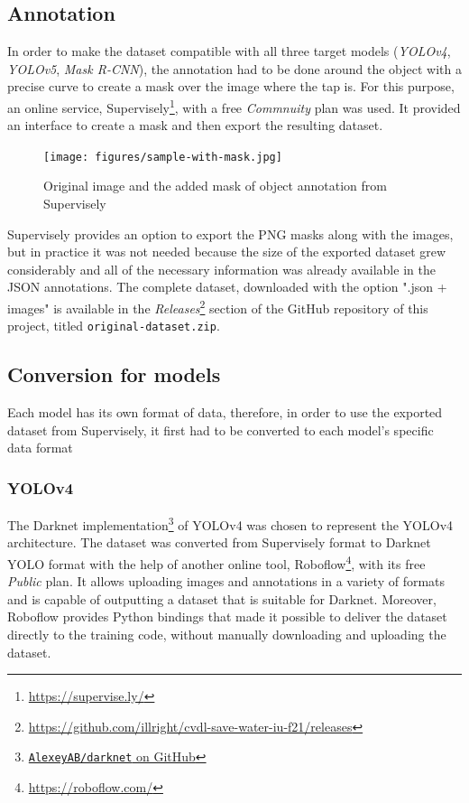 \documentclass[journal,onecolumn]{IEEEtran}
\begin{document}
\subsection{Annotation}

In order to make the dataset compatible with all three target models (\emph{YOLOv4}, \emph{YOLOv5}, \emph{Mask R-CNN}), the annotation had to be done around the object with a precise curve to create a mask over the image where the tap is. For this purpose, an online service, Supervisely\footnote{\href{https://supervise.ly/}{https://supervise.ly/}}, with a free \emph{Commnuity} plan was used. It provided an interface to create a mask and then export the resulting dataset.

\begin{figure}
    \centering
    \texttt{[image: figures/sample-with-mask.jpg]}
    \caption{Original image and the added mask of object annotation from Supervisely}
\end{figure}

Supervisely provides an option to export the PNG masks along with the images, but in practice it was not needed because the size of the exported dataset grew considerably and all of the necessary information was already available in the JSON annotations. The complete dataset, downloaded with the option ".json + images" is available in the \emph{Releases}\footnote{\href{https://github.com/illright/cvdl-save-water-iu-f21/releases}{https://github.com/illright/cvdl-save-water-iu-f21/releases}} section of the GitHub repository of this project, titled \texttt{original-dataset.zip}.

\subsection{Conversion for models}

Each model has its own format of data, therefore, in order to use the exported dataset from Supervisely, it first had to be converted to each model's specific data format

\subsubsection{YOLOv4}

The Darknet implementation\footnote{\href{https://github.com/AlexeyAB/darknet}{\texttt{AlexeyAB/darknet} on GitHub}} of YOLOv4 was chosen to represent the YOLOv4 architecture. The dataset was converted from Supervisely format to Darknet YOLO format with the help of another online tool, Roboflow\footnote{\href{https://roboflow.com/}{https://roboflow.com/}}, with its free \emph{Public} plan. It allows uploading images and annotations in a variety of formats and is capable of outputting a dataset that is suitable for Darknet. Moreover, Roboflow provides Python bindings that made it possible to deliver the dataset directly to the training code, without manually downloading and uploading the dataset.
\end{document}

